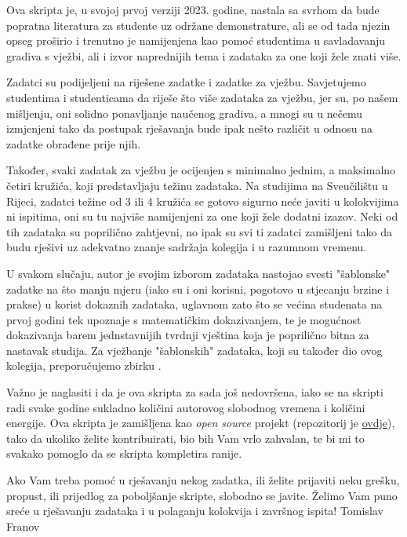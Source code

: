 \documentclass{book}
\begin{document}
Ova skripta je, u svojoj prvoj verziji 2023. godine, nastala sa svrhom da bude popratna literatura za studente uz održane demonstrature, ali se od tada njezin opseg proširio i trenutno je namijenjena kao pomoć studentima u savladavanju gradiva s vježbi, ali i izvor naprednijih tema i zadataka za one koji žele znati više. 

Zadatci su podijeljeni na riješene zadatke i zadatke za vježbu. Savjetujemo studentima i studenticama da riješe što više zadataka za vježbu, jer su, po našem mišljenju, oni solidno ponavljanje naučenog gradiva, a mnogi su u nečemu izmjenjeni tako da postupak rješavanja bude ipak nešto različit u odnosu na zadatke obrađene prije njih.

Također, svaki zadatak za vježbu je ocijenjen s minimalno jednim, a maksimalno četiri kružića, koji predstavljaju težinu zadataka. Na studijima na Sveučilištu u Rijeci, zadatci težine od $3$ ili $4$ kružića se gotovo sigurno neće javiti u kolokvijima ni ispitima, oni su tu najviše namijenjeni za one koji žele dodatni izazov. Neki od tih zadataka su poprilično zahtjevni, no ipak su svi ti zadatci zamišljeni tako da budu rješivi uz adekvatno znanje sadržaja kolegija i u razumnom vremenu.

U svakom slučaju, autor je svojim izborom zadataka nastojao svesti "šablonske" zadatke na što manju mjeru (iako su i oni korisni, pogotovo u stjecanju brzine i prakse) u korist dokaznih zadataka, uglavnom zato što se većina studenata na prvoj godini tek upoznaje s matematičkim dokazivanjem, te je mogućnost dokazivanja barem jednstavnijih tvrdnji vještina koja je poprilično bitna za nastavak studija. Za vježbanje "šablonskih" zadataka, koji su također dio ovog kolegija, preporučujemo zbirku \cite{8}.

Važno je naglasiti i da je ova skripta za sada još nedovršena, iako se na skripti radi svake godine sukladno količini autorovog slobodnog vremena i količini energije. Ova skripta je zamišljena kao \textit{open source} projekt (repozitorij je \href{https://github.com/tfranov/Zadatci-iz-MA1}{ovdje}), tako da ukoliko želite kontribuirati, bio bih Vam vrlo zahvalan, te bi mi to svakako pomoglo da se skripta kompletira ranije.

Ako Vam treba pomoć u rješavanju nekog zadatka, ili želite prijaviti neku grešku, propust, ili prijedlog za poboljšanje skripte, slobodno se javite. Želimo Vam puno sreće u rješavanju zadataka i u polaganju kolokvija i završnog ispita!
\flushright
\flushleft
\justifying
\noindent Tomislav Franov
\thispagestyle{empty}
\large
\pagestyle{fancy}
\fancyhead[RO, RE]{}
\end{document}
